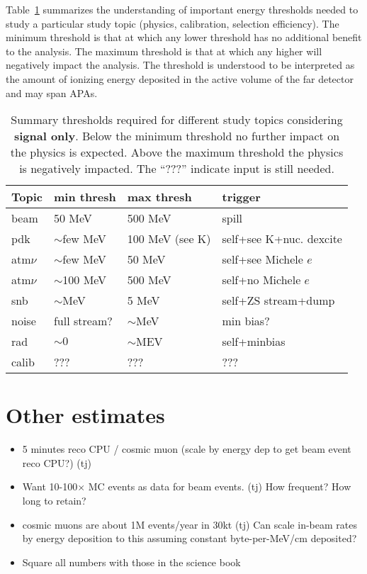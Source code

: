 Table~\ref{tab:physrates} summarizes the understanding of important
energy thresholds needed to study a particular study topic (physics,
calibration, selection efficiency).
The minimum threshold is that at which any lower threshold has no
additional benefit to the analysis.
The maximum threshold is that at which any higher will negatively
impact the analysis.
The threshold is understood to be interpreted as the amount of
ionizing energy deposited in the active volume of the far detector
and may span APAs.

\begin{table}[htbf]
  \centering
  \begin{tabular}{|l||l|l|l|}
    \hline
    Topic & min thresh & max thresh & trigger \\
    \hline
    \hline
    beam & 50 MeV & 500 MeV & spill \\
    \hline
    pdk & $\sim$few MeV & 100 MeV (see K) & self+see K+nuc. dexcite \\
    \hline
    atm$\nu$ & $\sim$few MeV & 50 MeV &
    self+see Michele $e$ \\
    atm$\nu$ & $\sim$100 MeV & 500 MeV &
    self+no Michele $e$ \\
    \hline
    snb & $\sim$MeV & 5 MeV & self+ZS stream+dump \\
    \hline
    noise & full stream?&$\sim$MeV& min bias?\\
    \hline
    rad &$\sim 0$ & $\sim$MEV & self+minbias\\
    \hline
    calib & ??? & ??? & ??? \\
    \hline
  \end{tabular}
  \caption{Summary thresholds required for different study topics
    considering \textbf{signal only}.
  Below the minimum threshold no further impact on the physics is
  expected.
  Above the maximum threshold the physics is negatively impacted.
  The ``???'' indicate input is still needed.}
  \label{tab:physrates}
\end{table}

\section{Other estimates}

\begin{itemize}
\item 5 minutes reco CPU / cosmic muon (scale by energy dep to get
  beam event reco CPU?)
  (tj)
\item Want 10-100$\times$ MC events as data for beam events.
  (tj)
  How frequent?
  How long to retain?
\item cosmic muons are about 1M events/year in 30kt (tj)
Can scale in-beam rates by energy deposition to this assuming constant
byte-per-MeV/cm deposited?
\item Square all numbers with those in the science book  
\end{itemize}

